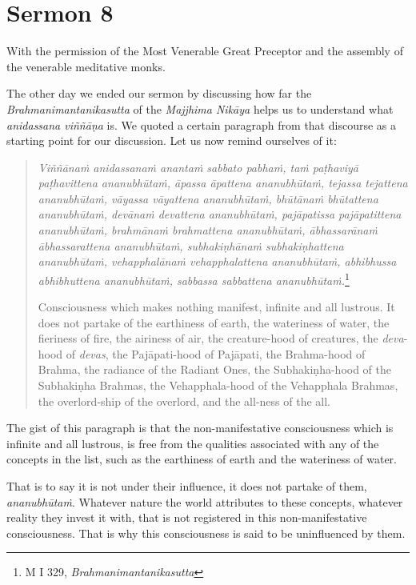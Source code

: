 \chapter{Sermon 8}

\NibbanaOpeningQuote

With the permission of the Most Venerable Great Preceptor and the assembly of the venerable meditative monks.

The other day we ended our sermon by discussing how far the \emph{Brahmanimantanikasutta} of the \emph{Majjhima Nikāya} helps us to understand what \emph{anidassana viññāṇa} is. We quoted a certain paragraph from that discourse as a starting point for our discussion. Let us now remind ourselves of it:

\begin{quote}
\emph{Viññānaṁ anidassanaṁ anantaṁ sabbato pabhaṁ, taṁ paṭhaviyā paṭhavittena ananubhūtaṁ, āpassa āpattena ananubhūtaṁ, tejassa tejattena ananubhūtaṁ, vāyassa vāyattena ananubhūtaṁ, bhūtānaṁ bhūtattena ananubhūtaṁ, devānaṁ devattena ananubhūtaṁ, pajāpatissa pajāpatittena ananubhūtaṁ, brahmānaṁ brahmattena ananubhūtaṁ, ābhassarānaṁ ābhassarattena ananubhūtaṁ, subhakiṇhānaṁ subhakiṇhattena ananubhūtaṁ, vehapphalānaṁ vehapphalattena ananubhūtaṁ, abhibhussa abhibhuttena ananubhūtaṁ, sabbassa sabbattena ananubhūtaṁ.}\footnote{M I 329, \emph{Brahmanimantanikasutta}}

Consciousness which makes nothing manifest, infinite and all lustrous. It does not partake of the earthiness of earth, the wateriness of water, the fieriness of fire, the airiness of air, the creature-hood of creatures, the \emph{deva}-hood of \emph{devas}, the Pajāpati-hood of Pajāpati, the Brahma-hood of Brahma, the radiance of the Radiant Ones, the Subhakiṇha-hood of the Subhakiṇha Brahmas, the Vehapphala-hood of the Vehapphala Brahmas, the overlord-ship of the overlord, and the all-ness of the all.
\end{quote}

The gist of this paragraph is that the non-manifestative consciousness which is infinite and all lustrous, is free from the qualities associated with any of the concepts in the list, such as the earthiness of earth and the wateriness of water.

That is to say it is not under their influence, it does not partake of them, \emph{ananubhūtaṁ}. Whatever nature the world attributes to these concepts, whatever reality they invest it with, that is not registered in this non-manifestative consciousness. That is why this consciousness is said to be uninfluenced by them.

